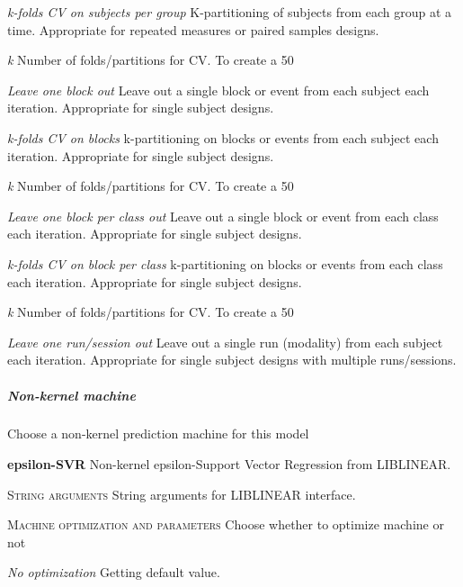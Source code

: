 \textit{k-folds CV on subjects per group}
K-partitioning of subjects from each group at a time. Appropriate for repeated measures or paired samples designs.


\textit{k}
Number of folds/partitions for CV. To create a 50%


\textit{Leave one block out}
Leave out a single block or event from each subject each iteration. Appropriate for single subject designs.


\textit{k-folds CV on blocks}
k-partitioning on blocks or events from each subject each iteration. Appropriate for single subject designs.


\textit{k}
Number of folds/partitions for CV. To create a 50%


\textit{Leave one block per class out}
Leave out a single block or event from each class each iteration. Appropriate for single subject designs.


\textit{k-folds CV on block per class}
k-partitioning on blocks or events from each class each iteration. Appropriate for single subject designs.


\textit{k}
Number of folds/partitions for CV. To create a 50%


\textit{Leave one run/session out}
Leave out a single run (modality) from each subject each iteration. Appropriate for single subject designs with multiple runs/sessions.


\subparagraph{Non-kernel machine}
Choose a non-kernel prediction machine for this model


\textbf{epsilon-SVR}
Non-kernel epsilon-Support Vector Regression from LIBLINEAR.


\textsc{String arguments}
String arguments for LIBLINEAR interface.


\textsc{Machine optimization and parameters}
Choose whether to optimize machine or not


\textsl{No optimization}
Getting default value.


